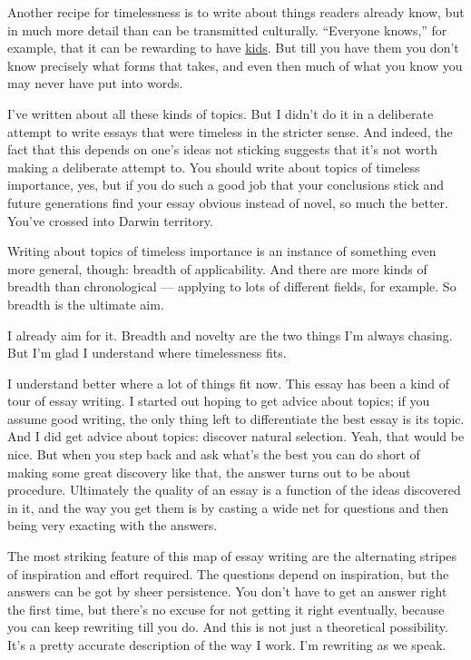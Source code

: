Another recipe for timelessness is to write about things readers already
know, but in much more detail than can be transmitted culturally.
``Everyone knows,'' for example, that it can be rewarding to have
\href{kids.html}{kids}. But till you have them you don't know precisely
what forms that takes, and even then much of what you know you may never
have put into words.

I've written about all these kinds of topics. But I didn't do it in a
deliberate attempt to write essays that were timeless in the stricter
sense. And indeed, the fact that this depends on one's ideas not
sticking suggests that it's not worth making a deliberate attempt to.
You should write about topics of timeless importance, yes, but if you do
such a good job that your conclusions stick and future generations find
your essay obvious instead of novel, so much the better. You've crossed
into Darwin territory.

Writing about topics of timeless importance is an instance of something
even more general, though: breadth of applicability. And there are more
kinds of breadth than chronological --- applying to lots of different
fields, for example. So breadth is the ultimate aim.

I already aim for it. Breadth and novelty are the two things I'm always
chasing. But I'm glad I understand where timelessness fits.

I understand better where a lot of things fit now. This essay has been a
kind of tour of essay writing. I started out hoping to get advice about
topics; if you assume good writing, the only thing left to differentiate
the best essay is its topic. And I did get advice about topics: discover
natural selection. Yeah, that would be nice. But when you step back and
ask what's the best you can do short of making some great discovery like
that, the answer turns out to be about procedure. Ultimately the quality
of an essay is a function of the ideas discovered in it, and the way you
get them is by casting a wide net for questions and then being very
exacting with the answers.

The most striking feature of this map of essay writing are the
alternating stripes of inspiration and effort required. The questions
depend on inspiration, but the answers can be got by sheer persistence.
You don't have to get an answer right the first time, but there's no
excuse for not getting it right eventually, because you can keep
rewriting till you do. And this is not just a theoretical possibility.
It's a pretty accurate description of the way I work. I'm rewriting as
we speak.

